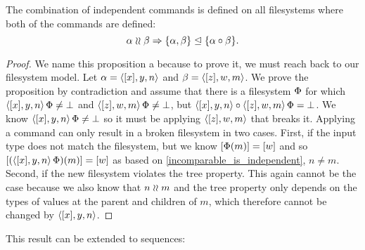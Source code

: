 \begin{myax}\label{combine_independent_commands}
The combination of independent commands is defined on all filesystems
where both of the commands are defined:
\[ \alpha\mathrel{\wr\wr} \beta \Rightarrow {\{\alpha, \beta\}}\trianglelefteq{\{\alpha\circ\beta\}}. \]
\end{myax}
\begin{proof}
We name this proposition a  
because to prove it, we must reach back to our filesystem model.
Let $\alpha=\langle{[x],y,n}\rangle$ and $\beta=\langle{[z],w,m}\rangle$.
We prove the proposition by contradiction and
assume that there is a filesystem $\Phi$ for which
$\langle{[x],y,n}\rangle\,\Phi\neq\bot$ and $\langle{[z],w,m}\rangle\,\Phi\neq\bot$, but
$\langle{[x],y,n}\rangle\circ \langle{[z],w,m}\rangle\,\Phi=\bot$.
We know $\langle{[x],y,n}\rangle\,\Phi\neq\bot$ so it must be applying 
$\langle{[z],w,m}\rangle$ that breaks it.
Applying a command can only result in a broken filesystem in two cases.
First, if the input type does not match the filesystem,
but we know $[\Phi(m)]=[w]$ and so
$[(\langle{[x],y,n}\rangle\,\Phi)(m)]=[w]$ as based on \cref{incomparable_is_independent}, $n\neq m$.
Second, if the new filesystem violates the tree property.
This again cannot be the case because we also know that $n\mathrel{\wr\wr} m$
and the tree property only depends on the types of values at the parent and children of $m$,
which therefore cannot be changed by $\langle{[x],y,n}\rangle$.
\end{proof}

This result can be extended to sequences:

